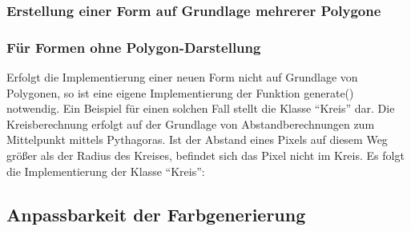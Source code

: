 

\newpage


\subsubsection{Erstellung einer Form auf Grundlage mehrerer Polygone}

\newpage


\subsubsection{Für Formen ohne Polygon-Darstellung}

Erfolgt die Implementierung einer neuen Form nicht auf Grundlage von Polygonen, so ist eine eigene Implementierung der Funktion generate() notwendig. Ein Beispiel für einen solchen Fall stellt die Klasse "`Kreis"' dar. Die Kreisberechnung erfolgt auf der Grundlage von Abstandberechnungen zum Mittelpunkt mittels Pythagoras. Ist der Abstand eines Pixels auf diesem Weg größer als der Radius des Kreises, befindet sich das Pixel nicht im Kreis. Es folgt die Implementierung der Klasse "`Kreis"': \\




\newpage

\subsection{Anpassbarkeit der Farbgenerierung}


\newpage